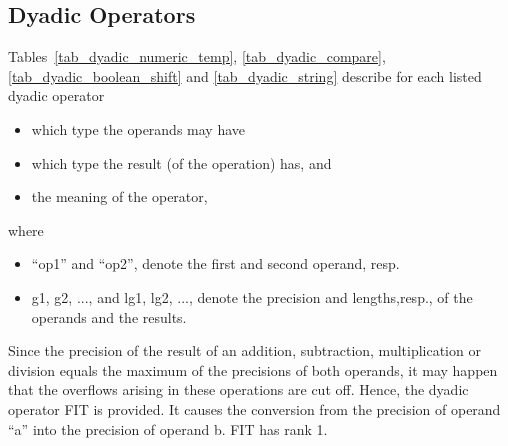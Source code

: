 \subsection{Dyadic Operators}   %

Tables~\ref{tab_dyadic_numeric_temp},
 \ref{tab_dyadic_compare}, \ref{tab_dyadic_boolean_shift} and 
\ref{tab_dyadic_string} describe for each listed dyadic operator
\begin{itemize}
\item which type the operands may have
\item which type the result (of the operation) has, and
\item the meaning of the operator,
\end{itemize}
where
\begin{itemize}
\item ``op1'' and ``op2'', denote the first and second operand, resp.
\item g1, g2, ..., and lg1, lg2, ..., denote the precision and
lengths,resp., of the operands and the results.
\end{itemize}
Since the precision of the result of an addition, subtraction,
multiplication or division equals the maximum of the precisions of both
operands, it may happen that the overflows arising in these operations
are cut off. Hence, the dyadic operator FIT is provided.
It causes the conversion from the precision of operand ``a'' into the
precision of operand b. FIT has rank 1.

